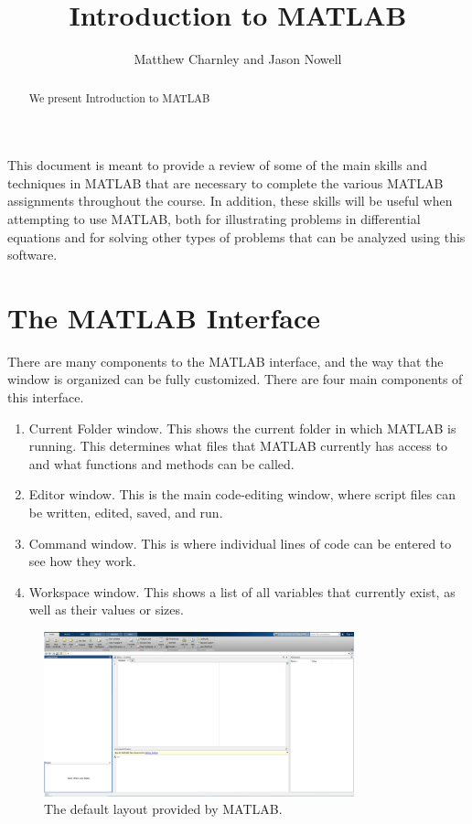 \documentclass{ximera}
\title{Introduction to MATLAB}
\author{Matthew Charnley and Jason Nowell}
\begin{document}
\begin{abstract}
    We present Introduction to MATLAB
\end{abstract}
\maketitle


\label{matlab:appendix}

This document is meant to provide a review of some of the main skills and techniques in MATLAB that are necessary to complete the various MATLAB assignments throughout the course. In addition, these skills will be useful when attempting to use MATLAB, both for illustrating problems in differential equations and for solving other types of problems that can be analyzed using this software.

\section{The MATLAB Interface}

There are many components to the MATLAB interface, and the way that the window is organized can be fully customized. There are four main components of this interface.
\begin{enumerate}
    \item Current Folder window. This shows the current folder in which MATLAB is running. This determines what files that MATLAB currently has access to and what functions and methods can be called.
    \item Editor window. This is the main code-editing window, where script files can be written, edited, saved, and run.
    \item Command window. This is where individual lines of code can be entered to see how they work. 
    \item Workspace window. This shows a list of all variables that currently exist, as well as their values or sizes.
\end{enumerate}

\begin{figure}[h]
    \centering
    \includegraphics[width=0.8\textwidth]{figures/MatlabDemo_layout.png}
    \caption{The default layout provided by MATLAB.}
    \label{fig:MatlabDemo_Layout}
\end{figure}
\end{document}
